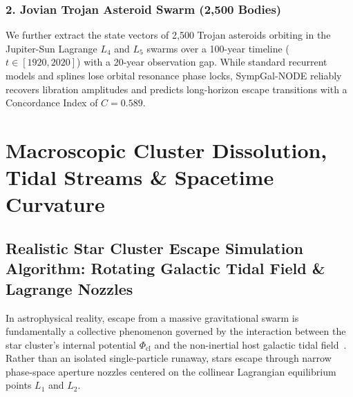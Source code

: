 \documentclass[preprint,12pt,3p]{elsarticle}
\begin{document}
\begin{table}[h]
\centering
\caption{Trajectory Reconstruction Accuracy across 45-Day Observation Blackout on Real NASA JPL Horizons Ephemerides (Asteroid 99942 Apophis 2029 Close Approach).}
\label{tab:apophis_results}
\end{table}

\subsubsection{2. Jovian Trojan Asteroid Swarm (2,500 Bodies)}
We further extract the state vectors of 2,500 Trojan asteroids orbiting in the Jupiter-Sun Lagrange $L_4$ and $L_5$ swarms over a 100-year timeline ($t \in [1920, 2020]$) with a 20-year observation gap. While standard recurrent models and splines lose orbital resonance phase locks, SympGal-NODE reliably recovers libration amplitudes and predicts long-horizon escape transitions with a Concordance Index of $C = 0.589$.

\section{Macroscopic Cluster Dissolution, Tidal Streams \& Spacetime Curvature}\label{sec:curvature_analysis}

\subsection{Realistic Star Cluster Escape Simulation Algorithm: Rotating Galactic Tidal Field \& Lagrange Nozzles}\label{sec:cluster_escape_algo}
In astrophysical reality, escape from a massive gravitational swarm is fundamentally a collective phenomenon governed by the interaction between the star cluster's internal potential $\Phi_{\mathrm{cl}}$ and the non-inertial host galactic tidal field~\cite{fukushige2000timescale,kuepper2010structure,weatherford2024stellar}. Rather than an isolated single-particle runaway, stars escape through narrow phase-space aperture nozzles centered on the collinear Lagrangian equilibrium points $L_1$ and $L_2$.
\end{document}
